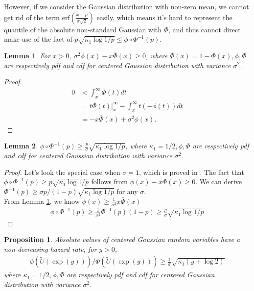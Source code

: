\documentclass{article}
\theoremstyle{plain}
\newtheorem{lemma}{Lemma}
\newtheorem{prop}{Proposition}
\begin{document}
However, if we consider the Gaussian distribution with non-zero mean, we cannot get rid of the term $\text{erf}(\frac{x + \mu}{\sigma \sqrt{2}})$ easily, which means it's hard to represent the quantile of the absolute non-standard Gaussian with $\Phi$, and thus cannot direct make use of the fact of $p \sqrt{\kappa_{1} \log 1 / p} \leq \phi \circ \Phi^{-1}(p)$.


\begin{lemma}
\label{lemma mills' ratio}
    For $x >0$, $ \sigma^2 \phi(x) -x \bar{\Phi}(x) \geq 0$, where $\bar{\Phi}(x) = 1 - \Phi(x),  \phi, \Phi$ are respectively pdf and cdf for centered Gaussian distribution with variance $\sigma^2$.
\end{lemma}
\begin{proof}
\begin{align}
    0 &< \int_x^\infty \bar{\Phi}(t) dt\\
    & = t \overline{\Phi}\left.(t)\right|_{x} ^{\infty}-\int_x^{\infty} t(-\phi(t)) d t\\
    &= -x \overline{\Phi}(x)+ \sigma^2 \phi(x).
\end{align}
\end{proof}

\begin{lemma}
    $\phi \circ \Phi^{-1}(p) \geq \frac{p}{\sigma} \sqrt{\kappa_1 \log 1/p}$,  where $\kappa_{1} = 1 / 2, \phi, \Phi$ are respectively pdf and cdf for centered Gaussian distribution with variance $\sigma^2$.
\end{lemma}
\begin{proof}
Let's look the special case when $\sigma = 1$, which is proved in \cite{boucheron2012}. The fact that $\phi \circ \Phi^{-1}(p) \geq p \sqrt{\kappa_1 \log 1/p}$ follows from $\phi(x) - x \bar{\Phi(x)} \geq 0$. We can derive $\Phi^{-1}(p) \geq \sigma p/(1-p) \sqrt{\kappa_1 \log 1/p}$ for any $\sigma$. \\

From Lemma \ref{lemma mills' ratio}, we know $ \phi(x) \geq \frac{1}{\sigma^2}x \bar{\Phi}(x)$
\begin{align}
    \phi \circ \Phi^{-1}(p) \geq \frac{1}{\sigma^2} \Phi^{-1}(p) (1-p) \geq \frac{p}{\sigma} \sqrt{\kappa_1 \log 1/p}
\end{align}
\end{proof}


\begin{prop}
\label{prop: hazard bound for normal}
Absolute values of centered Gaussian random variables have a non-decreasing
hazard rate, for $y>0$,
\begin{align}
    \phi(\tilde{U}(\exp (y))) / \overline{\Phi}(\tilde{U}(\exp (y))) \geq \frac{1}{\sigma} \sqrt{\kappa_{1}(y+\log 2)}
\end{align}
 where $\kappa_{1} = 1 / 2, \phi, \Phi$ are respectively pdf and cdf for centered Gaussian distribution with variance $\sigma^2$. 
\end{prop}
\end{document}
